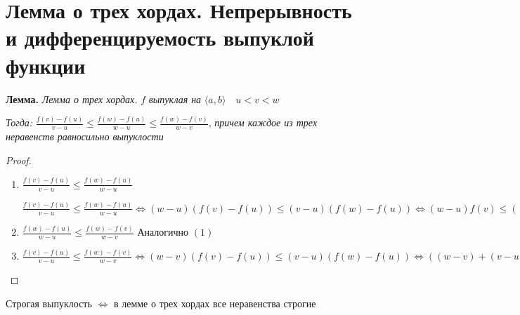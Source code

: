 \section{Лемма о трех хордах. Непрерывность и дифференцируемость выпуклой функции \href{https://youtu.be/CAxh8kYEOlQ?t=4860}{\Walley}}

\textbf{Лемма.}
\textit{
    Лемма о трех хордах.
} \quad $f$ \textit{
    выпуклая на 
} $\langle a, b \rangle \quad u < v < w$

\textit{Тогда: }$\frac{f(v) - f(u)}{v - u} \leqslant \frac{f(w) - f(u)}{w - u} \leqslant \frac{f(w) - f(v)}{w - v}$,
\textit{
    причем каждое из трех неравенств равносильно выпуклости
}
\begin{proof} \quad 

    \begin{enumerate} 
        \item $\frac{f(v) - f(u)}{v - u} \leqslant \frac{f(w) - f(u)}{w - u}$

        $\frac{f(v) - f(u)}{v - u} \leqslant \frac{f(w) - f(u)}{w - u} \Longleftrightarrow (w - u)
        (f(v) - f(u)) \leqslant (v - u)(f(w) - f(u)) \Longleftrightarrow (w-u)f(v) \leqslant
        ((w - u) - (v - u))f(u) + (v - u)f(w) = (w - v)f(u) + (v - u)f(w)$ 
        \item $\frac{f(w) - f(u)}{w - u} \leqslant \frac{f(w) - f(v)}{w - v}$ \qquad
        Аналогично $(1)$
        \item $\frac{f(v) - f(u)}{v - u} \leqslant \frac{f(w) - f(v)}{w - v} \Longleftrightarrow (w - v)
        (f(v) - f(u)) \leqslant (v - u)(f(w) - f(u)) \Longleftrightarrow ((w - v) + (v - u))f(v) \leqslant (w - v)f(u) +
        (v - u)f(w) \Longleftrightarrow (w - u)f(v) \leqslant (w - v)f(u) + (v - u)f(w)$
    \end{enumerate}
\end{proof}

\notice \; Строгая выпуклость $\Longleftrightarrow$ в лемме о трех хордах все неравенства строгие

